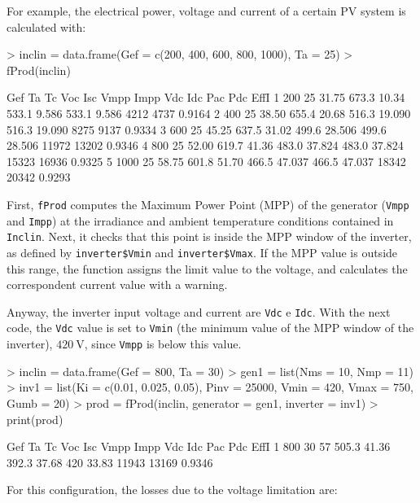 \documentclass[a4paper]{article}
\renewenvironment{Schunk}{\vspace{\topsep}}{\vspace{\topsep}}
\newcommand{\code}[1]{{\texttt{#1}}}
\begin{document}
For example, the electrical power, voltage and current of a certain PV
system is calculated with:

\begin{Schunk}
\begin{Sinput}
> inclin = data.frame(Gef = c(200, 400, 600, 800, 1000), Ta = 25)
> fProd(inclin)
\end{Sinput}
\begin{Soutput}
   Gef Ta    Tc   Voc   Isc  Vmpp   Impp   Vdc    Idc   Pac   Pdc   EffI
1  200 25 31.75 673.3 10.34 533.1  9.586 533.1  9.586  4212  4737 0.9164
2  400 25 38.50 655.4 20.68 516.3 19.090 516.3 19.090  8275  9137 0.9334
3  600 25 45.25 637.5 31.02 499.6 28.506 499.6 28.506 11972 13202 0.9346
4  800 25 52.00 619.7 41.36 483.0 37.824 483.0 37.824 15323 16936 0.9325
5 1000 25 58.75 601.8 51.70 466.5 47.037 466.5 47.037 18342 20342 0.9293
\end{Soutput}
\end{Schunk}

First, \code{fProd} computes the Maximum Power Point (MPP) of the
generator (\code{Vmpp} and \code{Impp}) at the irradiance and
ambient temperature conditions contained in \code{Inclin}. Next, it
checks that this point is inside the MPP window of the inverter, as
defined by \code{inverter\$Vmin} and \code{inverter\$Vmax}.  If
the MPP value is outside this range, the function assigns the limit
value to the voltage, and calculates the correspondent current value
with a warning.

Anyway, the inverter input voltage and current are  \code{Vdc} e
\code{Idc}. With the next code, the \code{Vdc} value is
set to \code{Vmin} (the minimum value of the MPP window of the
inverter), $\SI{420}{\volt}$,  since \code{Vmpp} is below this value.

\begin{Schunk}
\begin{Sinput}
> inclin = data.frame(Gef = 800, Ta = 30)
> gen1 = list(Nms = 10, Nmp = 11)
> inv1 = list(Ki = c(0.01, 0.025, 0.05), Pinv = 25000, Vmin = 420, 
     Vmax = 750, Gumb = 20)
> prod = fProd(inclin, generator = gen1, inverter = inv1)
> print(prod)
\end{Sinput}
\begin{Soutput}
  Gef Ta Tc   Voc   Isc  Vmpp  Impp Vdc   Idc   Pac   Pdc   EffI
1 800 30 57 505.3 41.36 392.3 37.68 420 33.83 11943 13169 0.9346
\end{Soutput}
\end{Schunk}

For this configuration, the losses due to the voltage limitation are:
\end{document}
